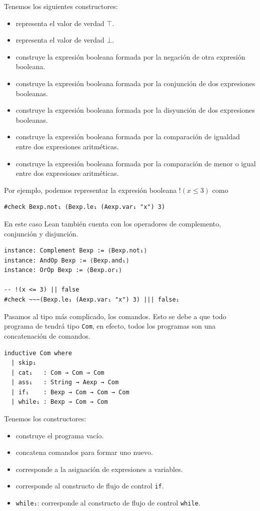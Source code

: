 \documentclass[../main.tex]{subfiles}
\begin{document}
Tenemos los siguientes constructores:
\begin{itemize}
  \item [\texttt{true₁}:] representa el valor de verdad \(\top\).
  \item [\texttt{false₁}:] representa el valor de verdad \(\bot\).
  \item [\texttt{not₁}:] construye la expresión booleana formada por la negación de otra expresión booleana.
  \item [\texttt{and₁}:] construye la expresión booleana formada por la conjunción de dos expresiones booleanas.
  \item [\texttt{or₁}:] construye la expresión booleana formada por la disyunción de dos expresiones booleanas.
  \item [\texttt{eq₁}:] construye la expresión booleana formada por la comparación de igualdad entre dos expresiones aritméticas.
  \item [\texttt{le₁}:] construye la expresión booleana formada por la comparación de menor o igual entre dos expresiones aritméticas.
\end{itemize}

Por ejemplo, podemos representar la expresión booleana \(!(x \le 3)\) como
\begin{verbatim}
#check Bexp.not₁ (Bexp.le₁ (Aexp.var₁ "x") 3)
\end{verbatim}

En este caso Lean también cuenta con los operadores de complemento, conjunción y
disjunción.

\begin{verbatim}
instance: Complement Bexp := ⟨Bexp.not₁⟩
instance: AndOp Bexp := ⟨Bexp.and₁⟩
instance: OrOp Bexp := ⟨Bexp.or₁⟩

-- !(x <= 3) || false
#check ~~~(Bexp.le₁ (Aexp.var₁ "x") 3) ||| false₁
\end{verbatim}

Pasamos al tipo más complicado, los comandos. Esto se debe a que todo programa 
de  tendrá tipo \texttt{Com}, en efecto, todos los programas son una 
concatenación de comandos.

\begin{verbatim}
inductive Com where
  | skip₁
  | cat₁   : Com → Com → Com
  | ass₁   : String → Aexp → Com
  | if₁    : Bexp → Com → Com → Com
  | while₁ : Bexp → Com → Com
\end{verbatim}

Tenemos los constructores:
\begin{itemize}
  \item[\texttt{skip₁}:] construye el programa vacío.
  \item[\texttt{cat₁}:] concatena comandos para formar uno nuevo.
  \item[\texttt{ass₁}:] corresponde a la asignación de expresiones a variables.
  \item[\texttt{if₁}:] corresponde al constructo de flujo de control \texttt{if}.
  \item{\texttt{while₁}:} corresponde al constructo de flujo de control \texttt{while}.
\end{itemize}
\end{document}
